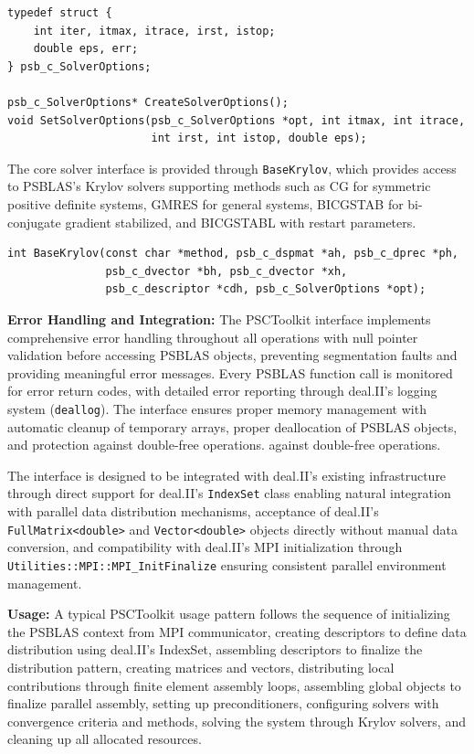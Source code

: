 \documentclass[a4paper,12pt]{article}
\begin{document}
\begin{lstlisting}[caption=Solver options structure and management]
typedef struct {
    int iter, itmax, itrace, irst, istop;
    double eps, err;
} psb_c_SolverOptions;

psb_c_SolverOptions* CreateSolverOptions();
void SetSolverOptions(psb_c_SolverOptions *opt, int itmax, int itrace,
                      int irst, int istop, double eps);
\end{lstlisting}

The core solver interface is provided through \texttt{BaseKrylov}, which provides access to
PSBLAS's Krylov solvers supporting methods such as CG for symmetric positive definite
systems, GMRES for general systems, BICGSTAB for bi-conjugate gradient stabilized,
and BICGSTABL with restart parameters.

\begin{lstlisting}[caption=Krylov solver interface]
int BaseKrylov(const char *method, psb_c_dspmat *ah, psb_c_dprec *ph,
               psb_c_dvector *bh, psb_c_dvector *xh,
               psb_c_descriptor *cdh, psb_c_SolverOptions *opt);
\end{lstlisting}

\textbf{Error Handling and Integration:} The PSCToolkit interface implements
comprehensive error handling throughout all operations with null pointer validation
before accessing PSBLAS objects, preventing segmentation faults and providing meaningful
error messages. Every PSBLAS function call is monitored for error return codes, with
detailed error reporting through deal.II's logging system (\texttt{deallog}). The
interface ensures proper memory management with automatic cleanup of temporary arrays,
proper deallocation of PSBLAS objects, and protection against double-free operations.
against double-free operations.

The interface is designed to be integrated with deal.II's existing
infrastructure through direct support for deal.II's \texttt{IndexSet}
class enabling natural integration with parallel data distribution mechanisms,
acceptance of deal.II's \texttt{FullMatrix<double>} and \texttt{Vector<double>}
objects directly without manual data conversion, and compatibility with deal.II's
MPI initialization through \texttt{Utilities::MPI::MPI\_InitFinalize} ensuring
consistent parallel environment management.

\textbf{Usage:} A typical PSCToolkit usage pattern follows the sequence of initializing
the PSBLAS context from MPI communicator, creating descriptors to define data
distribution using deal.II's IndexSet, assembling descriptors to finalize the
distribution pattern, creating matrices and vectors, distributing local
contributions through finite element assembly loops, assembling global
objects to finalize parallel assembly, setting up preconditioners, configuring
solvers with convergence criteria and methods, solving the system through Krylov
solvers, and cleaning up all allocated resources.
\end{document}
